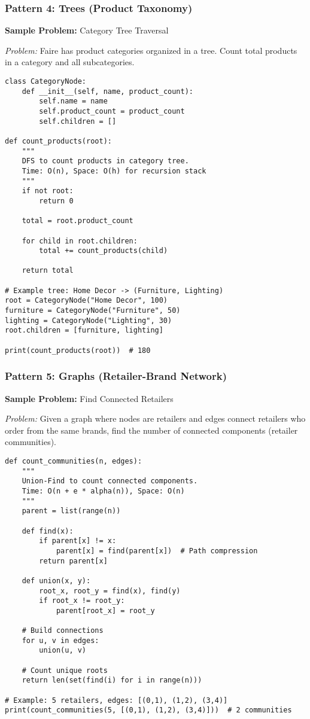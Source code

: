 \documentclass[11pt,letterpaper]{article}
\begin{document}
\subsubsection{Pattern 4: Trees (Product Taxonomy)}

\textbf{Sample Problem:} Category Tree Traversal

\textit{Problem:} Faire has product categories organized in a tree. Count total products in a category and all subcategories.

\begin{lstlisting}
class CategoryNode:
    def __init__(self, name, product_count):
        self.name = name
        self.product_count = product_count
        self.children = []

def count_products(root):
    """
    DFS to count products in category tree.
    Time: O(n), Space: O(h) for recursion stack
    """
    if not root:
        return 0

    total = root.product_count

    for child in root.children:
        total += count_products(child)

    return total

# Example tree: Home Decor -> (Furniture, Lighting)
root = CategoryNode("Home Decor", 100)
furniture = CategoryNode("Furniture", 50)
lighting = CategoryNode("Lighting", 30)
root.children = [furniture, lighting]

print(count_products(root))  # 180
\end{lstlisting}

\subsubsection{Pattern 5: Graphs (Retailer-Brand Network)}

\textbf{Sample Problem:} Find Connected Retailers

\textit{Problem:} Given a graph where nodes are retailers and edges connect retailers who order from the same brands, find the number of connected components (retailer communities).

\begin{lstlisting}
def count_communities(n, edges):
    """
    Union-Find to count connected components.
    Time: O(n + e * alpha(n)), Space: O(n)
    """
    parent = list(range(n))

    def find(x):
        if parent[x] != x:
            parent[x] = find(parent[x])  # Path compression
        return parent[x]

    def union(x, y):
        root_x, root_y = find(x), find(y)
        if root_x != root_y:
            parent[root_x] = root_y

    # Build connections
    for u, v in edges:
        union(u, v)

    # Count unique roots
    return len(set(find(i) for i in range(n)))

# Example: 5 retailers, edges: [(0,1), (1,2), (3,4)]
print(count_communities(5, [(0,1), (1,2), (3,4)]))  # 2 communities
\end{lstlisting}
\end{document}
